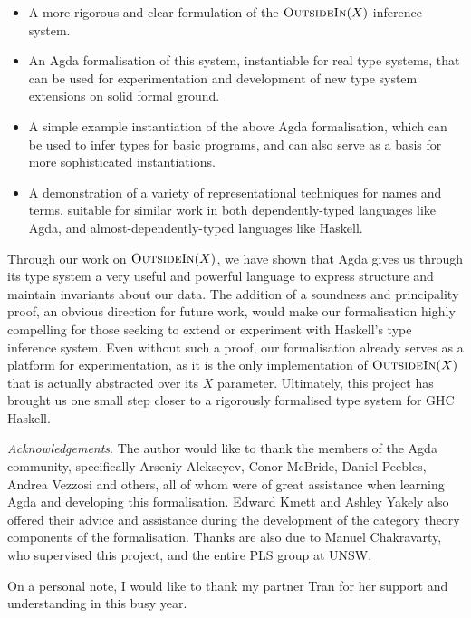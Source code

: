 \documentclass[a4paper]{jfp}
\newcommand{\outsidein}{\textsc{OutsideIn}(X)}
\begin{document}
\begin{itemize}
      \item A more rigorous and clear formulation of the $\outsidein$ inference system.
      \item An Agda formalisation of this system, instantiable for real type systems, that can be used for experimentation and development of new type 
         system extensions on solid formal ground.
      \item A simple example instantiation of the above Agda formalisation, which can be used to infer types for basic programs, and can also serve as
         a basis for more sophisticated instantiations.
      \item A demonstration of a variety of representational techniques for names and terms, suitable for similar work in both dependently-typed
         languages like Agda, and almost-dependently-typed languages like Haskell.
\end{itemize}

Through our work on $\outsidein$, we have shown that Agda gives us through its type system a very useful and powerful language to express structure
and maintain invariants about our data. The addition of a soundness and principality proof, an obvious direction for future work, would
make our formalisation highly compelling for those seeking to extend or experiment with Haskell's type inference system. Even without such a proof,
our formalisation already serves as a platform for experimentation, as it is the only implementation of $\outsidein$ that is actually abstracted over
its $X$ parameter.  Ultimately, this project has brought us one small step closer to a rigorously formalised type system for GHC Haskell.

\bigskip

\bigskip

\bigskip

\emph{Acknowledgements}. The author would like to thank the members of the Agda community, specifically Arseniy Alekseyev, Conor McBride, Daniel
Peebles, Andrea Vezzosi and others, all of whom were of great assistance when learning Agda and developing this formalisation. Edward Kmett and Ashley
Yakely also offered their advice and assistance during the development of the category theory components of the formalisation. Thanks are also due to
Manuel Chakravarty, who supervised this project, and the entire PLS group at UNSW. 

On a personal note, I would like to thank my partner Tran for her support and understanding in this busy year.
\bigskip


	
\end{document}
